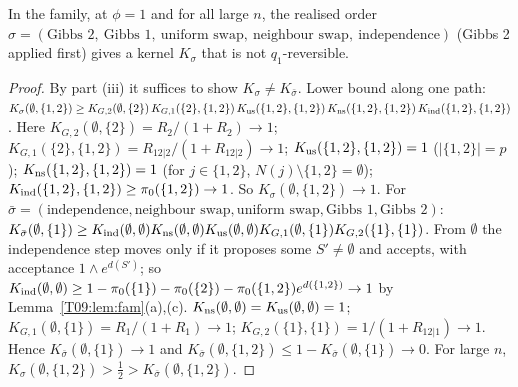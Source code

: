 \documentclass[11pt]{report}
\begin{document}
\begin{T09proposition}\label{T09:prop:nonrev}
In the family, at $\phi=1$ and for all large $n$, the realised order $\sigma=(\text{Gibbs }2,\ \text{Gibbs }1,\ \text{uniform swap},\ \text{neighbour swap},\ \text{independence})$ (Gibbs 2 applied first) gives a kernel $K_\sigma$ that is not $q_1$-reversible.
\end{T09proposition}
\begin{proof}
By part (iii) it suffices to show $K_\sigma\ne K_{\bar\sigma}$. Lower bound along one path:
$K_\sigma(\emptyset,\{1,2\})\ge K_{G,2}(\emptyset,\{2\})\,K_{G,1}(\{2\},\{1,2\})\,K_{\rm us}(\{1,2\},\{1,2\})\,K_{\rm ns}(\{1,2\},\{1,2\})\,K_{\rm ind}(\{1,2\},\{1,2\})$.
Here $K_{G,2}(\emptyset,\{2\})=R_2/(1+R_2)\to1$; $K_{G,1}(\{2\},\{1,2\})=R_{12|2}/(1+R_{12|2})\to1$; $K_{\rm us}(\{1,2\},\{1,2\})=1$ ($|\{1,2\}|=p$); $K_{\rm ns}(\{1,2\},\{1,2\})=1$ (for $j\in\{1,2\}$, $N(j)\setminus\{1,2\}=\emptyset$); $K_{\rm ind}(\{1,2\},\{1,2\})\ge\pi_0(\{1,2\})\to1$. So $K_\sigma(\emptyset,\{1,2\})\to1$.
For $\bar\sigma=(\text{independence},\text{neighbour swap},\text{uniform swap},\text{Gibbs }1,\text{Gibbs }2)$:
$K_{\bar\sigma}(\emptyset,\{1\})\ge K_{\rm ind}(\emptyset,\emptyset)K_{\rm ns}(\emptyset,\emptyset)K_{\rm us}(\emptyset,\emptyset)K_{G,1}(\emptyset,\{1\})K_{G,2}(\{1\},\{1\})$. From $\emptyset$ the independence step moves only if it proposes some $S'\ne\emptyset$ and accepts, with acceptance $1\wedge e^{d(S')}$; so $K_{\rm ind}(\emptyset,\emptyset)\ge1-\pi_0(\{1\})-\pi_0(\{2\})-\pi_0(\{1,2\})e^{d(\{1,2\})}\to1$ by Lemma~\ref{T09:lem:fam}(a),(c). $K_{\rm ns}(\emptyset,\emptyset)=K_{\rm us}(\emptyset,\emptyset)=1$; $K_{G,1}(\emptyset,\{1\})=R_1/(1+R_1)\to1$; $K_{G,2}(\{1\},\{1\})=1/(1+R_{12|1})\to1$. Hence $K_{\bar\sigma}(\emptyset,\{1\})\to1$ and $K_{\bar\sigma}(\emptyset,\{1,2\})\le1-K_{\bar\sigma}(\emptyset,\{1\})\to0$. For large $n$, $K_\sigma(\emptyset,\{1,2\})>\tfrac12>K_{\bar\sigma}(\emptyset,\{1,2\})$.
\end{proof}
\end{document}
